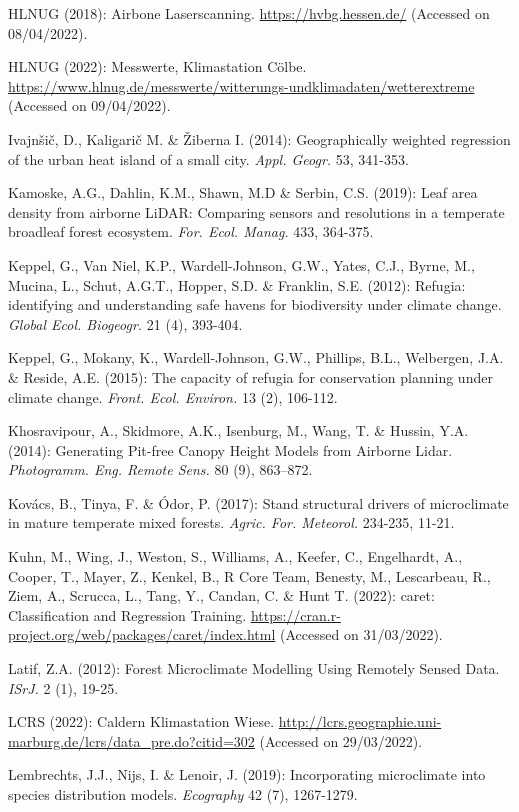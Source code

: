 \documentclass[5p]{elsarticle} %
\newlength{\cslhangindent}
\newlength{\cslentryspacingunit} %
\newenvironment{CSLReferences}[2] %
 {%
  \setlength{\parindent}{0pt}
  \ifodd #1
  \let\oldpar\par
  \def\par{\hangindent=\cslhangindent\oldpar}
  \fi
  \setlength{\parskip}{#2\cslentryspacingunit}
 }%
 {}
\begin{document}
\begin{CSLReferences}{1}{0}
HLNUG (2018): Airbone Laserscanning. \url{https://hvbg.hessen.de/} (Accessed on 08/04/2022).

HLNUG (2022): Messwerte, Klimastation Cölbe. \url{https://www.hlnug.de/messwerte/witterungs-undklimadaten/wetterextreme} (Accessed on 09/04/2022).

Ivajnšič, D., Kaligarič M. \& Žiberna I. (2014): Geographically weighted regression of the urban heat island of a small city. \emph{Appl. Geogr.} 53, 341-353. 

Kamoske, A.G., Dahlin, K.M., Shawn, M.D \& Serbin, C.S. (2019): Leaf area density from airborne LiDAR: Comparing sensors and resolutions in a temperate broadleaf forest ecosystem. \emph{For. Ecol. Manag.} 433, 364-375.

Keppel, G., Van Niel, K.P., Wardell-Johnson, G.W., Yates, C.J., Byrne, M., Mucina, L., Schut, A.G.T., Hopper, S.D. \& Franklin, S.E. (2012): Refugia: identifying and understanding safe havens for biodiversity under climate change. \emph{Global Ecol. Biogeogr.} 21 (4), 393-404.

Keppel, G., Mokany, K., Wardell-Johnson, G.W., Phillips, B.L., Welbergen, J.A. \& Reside, A.E. (2015): The capacity of refugia for conservation planning under climate change. \emph{Front. Ecol. Environ.} 13 (2), 106-112.

Khosravipour, A., Skidmore, A.K., Isenburg, M., Wang, T. \& Hussin, Y.A. (2014): Generating Pit-free Canopy Height Models from Airborne Lidar. \emph{Photogramm. Eng. Remote Sens.} 80 (9), 863–872.

Kovács, B., Tinya, F. \& Ódor, P. (2017): Stand structural drivers of microclimate in mature temperate mixed forests. \emph{Agric. For. Meteorol.} 234-235, 11-21.

Kuhn, M., Wing, J., Weston, S., Williams, A., Keefer, C., Engelhardt, A., Cooper, T., Mayer, Z., Kenkel, B., R Core Team, Benesty, M., Lescarbeau, R., Ziem, A., Scrucca, L., Tang, Y., Candan, C. \& Hunt T. (2022):  caret: Classification and Regression Training. \url{https://cran.r-project.org/web/packages/caret/index.html} (Accessed on 31/03/2022).
 
Latif, Z.A. (2012): Forest Microclimate Modelling Using Remotely Sensed Data. \emph{ISrJ.} 2 (1), 19-25.

LCRS (2022): Caldern Klimastation Wiese. \url{http://lcrs.geographie.uni-marburg.de/lcrs/data_pre.do?citid=302} (Accessed on 29/03/2022).

Lembrechts, J.J., Nijs, I. \& Lenoir, J. (2019): Incorporating microclimate into species distribution models. \emph{Ecography} 42 (7), 1267-1279.


\end{CSLReferences}
\end{document}
